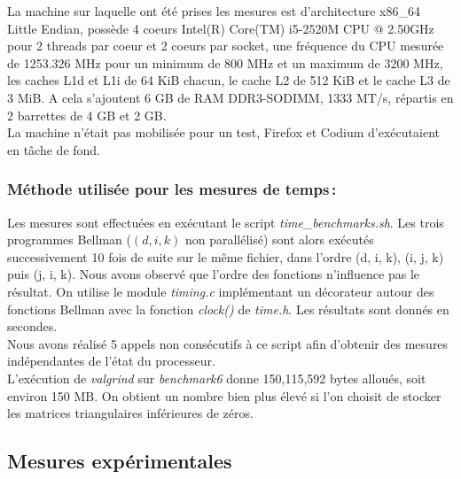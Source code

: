 \documentclass[a4paper, 10pt, french]{article}
\begin{document}
La machine sur laquelle ont été prises les mesures est d'architecture x86\_64 Little Endian, possède 4 coeurs Intel(R) Core(TM) i5-2520M CPU @ 2.50GHz pour 2 threads par coeur et 2 coeurs par socket, une fréquence du CPU mesurée de 1253.326 MHz pour un minimum de 800 MHz et un maximum de 3200 MHz, les caches L1d et L1i de 64 KiB chacun, le cache L2 de 512 KiB et le cache L3 de 3 MiB. 
A cela s'ajoutent 6 GB de RAM DDR3-SODIMM, 1333 MT/s, répartis en 2 barrettes de 4 GB et 2 GB.
\\

La machine n'était pas mobilisée pour un test, Firefox et Codium d'exécutaient en tâche de fond.

\subsubsection{Méthode utilisée pour les mesures de temps\,: }

Les mesures sont effectuées en exécutant le script {\em time\_benchmarks.sh}. Les trois programmes Bellman ($(d, i, k)$ non parallélisé) sont alors exécutés successivement 10 fois de suite sur le même fichier, dans l'ordre (d, i, k), (i, j, k) puis (j, i, k). Nous avons observé que l'ordre des fonctions n'influence pas le résultat. 
On utilise le module {\em timing.c} implémentant un décorateur autour des fonctions Bellman avec la fonction {\em clock()} de {\em time.h}. Les résultats sont donnés en secondes. \\

Nous avons réalisé 5 appels non consécutifs à ce script afin d'obtenir des mesures indépendantes de l'état du processeur. \\

L'exécution de {\em valgrind} sur {\em benchmark6} donne 150,115,592 bytes alloués, soit environ 150 MB. On obtient un nombre bien plus élevé si l'on choisit de stocker les matrices triangulaires inférieures de zéros.

\subsection{Mesures expérimentales}
\end{document}
